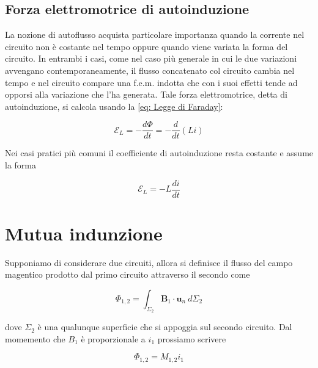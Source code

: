 \subsection{Forza elettromotrice di autoinduzione}

La nozione di autoflusso acquista particolare importanza quando la corrente nel circuito non è costante nel tempo oppure quando viene variata la forma del circuito. 
In entrambi i casi, come nel caso più generale in cui le due variazioni avvengano contemporaneamente, il flusso concatenato col circuito cambia nel tempo e nel circuito compare una f.e.m. indotta che con i suoi effetti tende ad opporsi alla variazione che l’ha generata. 
Tale forza elettromotrice, detta di autoinduzione, si calcola usando la \ref{eq: Legge di Faraday}:

\begin{equation}
    \mathcal{E}_L = - \frac{d \Phi}{dt} = - \frac{d}{dt} (Li)
\end{equation}

Nei casi pratici più comuni il coefficiente di autoinduzione resta costante e assume la forma

\begin{tcolorbox}[colback=yellow!10!white, colframe=orange!70!black, boxrule=0.8pt]
\begin{equation} 
    \mathcal{E}_L = - L \frac{di}{dt}
\end{equation}
\end{tcolorbox}

\newpage

\section{Mutua indunzione}

Supponiamo di considerare due circuiti, allora si definisce il flusso del campo magentico prodotto dal primo circuito attraverso il secondo come 

\begin{equation}
    \Phi_{1,2} = \int_{\Sigma_2} \mathbf{B}_1 \cdot \mathbf{u}_n \ d\Sigma_2 
\end{equation}

dove $\Sigma_2$ è una qualunque superficie che si appoggia sul secondo circuito.
Dal momemento che $B_1$ è proporzionale a $i_1$ prossiamo scrivere

\begin{tcolorbox}[colback=yellow!10!white, colframe=orange!70!black, boxrule=0.8pt]
\begin{equation}
    \Phi_{1,2} = M_{1,2} i_1
\end{equation}
\end{tcolorbox}

